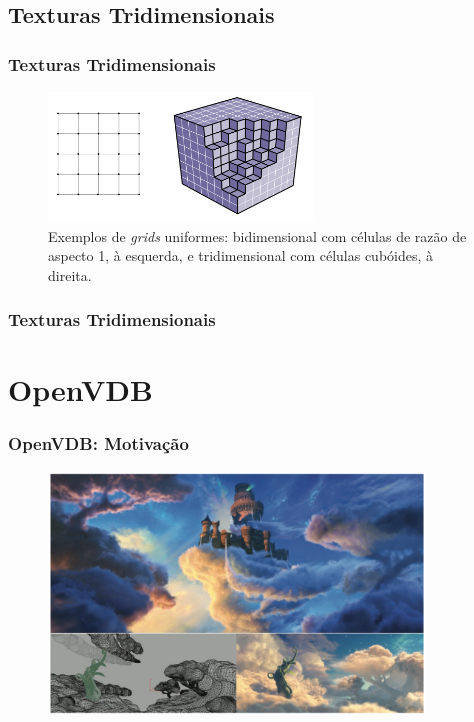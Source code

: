 \documentclass{beamer}
\begin{document}
\subsection{Texturas Tridimensionais}
\begin{frame}

\frametitle{Texturas Tridimensionais}

\begin{figure}[!htb]
\center
\includegraphics[width=7cm]{grid_example}
\caption{Exemplos de \emph{grids} uniformes: bidimensional com células de razão de aspecto 1, à esquerda, e tridimensional com células cubóides, à direita.}
\label{grid_ex}
\end{figure}

\end{frame}

\begin{frame}

\frametitle{Texturas Tridimensionais}



\end{frame}



\section{OpenVDB}
\begin{frame}

\frametitle{OpenVDB: Motivação}

\begin{figure}[!htb]
\center
\includegraphics[width=10cm]{puss}
\label{grid_ex}
\end{figure}

\end{frame}
\end{document}
